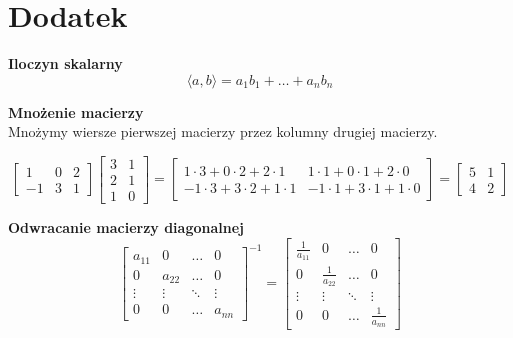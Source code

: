 \documentclass[../mn-notatki.tex]{subfiles}
\begin{document}
\section{Dodatek}

\begin{tcolorbox}
\textbf{Iloczyn skalarny}
\[
\langle a, b \rangle = a_1 b_1 + \ldots + a_n b_n
\]
\end{tcolorbox}


\begin{tcolorbox}
\textbf{Mnożenie macierzy}\\
Mnożymy wiersze pierwszej macierzy przez kolumny drugiej macierzy.

\[
{\begin{bmatrix}1&0&2\\-1&3&1\end{bmatrix}} {\begin{bmatrix}3&1\\2&1\\1&0\end{bmatrix}}=
{\begin{bmatrix}1\cdot 3+0\cdot 2+2\cdot 1&1\cdot 1+0\cdot 1+2\cdot 0\\
-1\cdot 3+3\cdot 2+1\cdot 1&-1\cdot 1+3\cdot 1+1\cdot 0\end{bmatrix}}=
{\begin{bmatrix}5&1\\4&2\end{bmatrix}}
\]
\end{tcolorbox}

\begin{tcolorbox}
\textbf{Odwracanie macierzy diagonalnej}
\[
\begin{bmatrix}
a_{11} & 0 & \ldots & 0\\
0 & a_{22} & \ldots & 0\\
\vdots & \vdots & \ddots & \vdots\\
0 & 0 & \ldots & a_{nn}
\end{bmatrix}^{-1}
=
\begin{bmatrix}
\frac{1}{a_{11}} & 0 & \ldots & 0\\
0 & \frac{1}{a_{22}} & \ldots & 0\\
\vdots & \vdots & \ddots & \vdots\\
0 & 0 & \ldots & \frac{1}{a_{nn}}
\end{bmatrix}
\]
\end{tcolorbox}

\pagebreak
\end{document}
